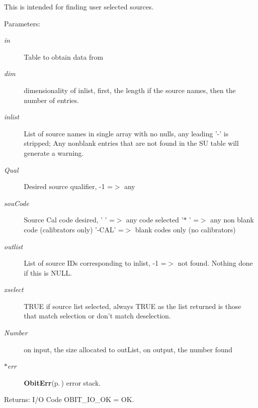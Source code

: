 This is intended for finding user selected sources. \begin{Desc}
\item[Parameters:]
\begin{description}
\item[{\em in}]Table to obtain data from \item[{\em dim}]dimensionality of inlist, first, the length if the source names, then the number of entries. \item[{\em inlist}]List of source names in single array with no nulls, any leading '-' is stripped; Any nonblank entries that are not found in the SU table will generate a warning. \item[{\em Qual}]Desired source qualifier, -1 =$>$ any \item[{\em sou\-Code}]Source Cal code desired, ' ' =$>$ any code selected '$\ast$ ' =$>$ any non blank code (calibrators only) '-CAL' =$>$ blank codes only (no calibrators) \item[{\em outlist}]List of source IDs corresponding to inlist, -1 =$>$ not found. Nothing done if this is NULL. \item[{\em xselect}]TRUE if source list selected, always TRUE as the list returned is those that match selection or don't match deselection. \item[{\em Number}]on input, the size allocated to out\-List, on output, the number found \item[{\em $\ast$err}]{\bf Obit\-Err}{\rm (p.\,\pageref{structObitErr})} error stack. \end{description}
\end{Desc}
\begin{Desc}
\item[Returns:]I/O Code OBIT\_\-IO\_\-OK = OK. \end{Desc}

